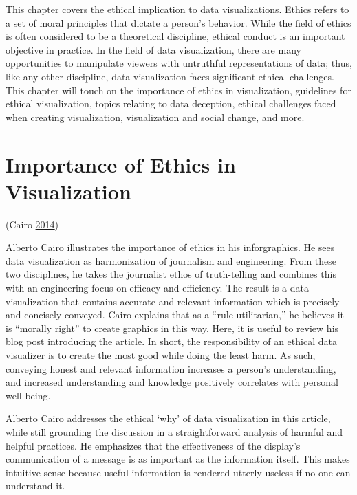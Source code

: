 \documentclass[]{book}
\begin{document}
This chapter covers the ethical implication to data visualizations. Ethics refers to a set of moral principles that dictate a person's behavior. While the field of ethics is often considered to be a theoretical discipline, ethical conduct is an important objective in practice. In the field of data visualization, there are many opportunities to manipulate viewers with untruthful representations of data; thus, like any other discipline, data visualization faces significant ethical challenges. This chapter will touch on the importance of ethics in visualization, guidelines for ethical visualization, topics relating to data deception, ethical challenges faced when creating visualization, visualization and social change, and more.

\hypertarget{importance-of-ethics-in-visualization}{%
\section{Importance of Ethics in Visualization}\label{importance-of-ethics-in-visualization}}

(Cairo \protect\hyperlink{ref-ethical_infographics}{2014})

Alberto Cairo illustrates the importance of ethics in his inforgraphics. He sees data visualization as harmonization of journalism and engineering. From these two disciplines, he takes the journalist ethos of truth-telling and combines this with an engineering focus on efficacy and efficiency. The result is a data visualization that contains accurate and relevant information which is precisely and concisely conveyed. Cairo explains that as a ``rule utilitarian,'' he believes it is ``morally right'' to create graphics in this way. Here, it is useful to review his blog post introducing the article. In short, the responsibility of an ethical data visualizer is to create the most good while doing the least harm. As such, conveying honest and relevant information increases a person's understanding, and increased understanding and knowledge positively correlates with personal well-being.

Alberto Cairo addresses the ethical `why' of data visualization in this article, while still grounding the discussion in a straightforward analysis of harmful and helpful practices. He emphasizes that the effectiveness of the display's communication of a message is as important as the information itself. This makes intuitive sense because useful information is rendered utterly useless if no one can understand it.
\end{document}
